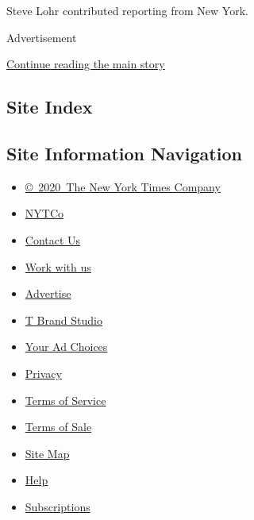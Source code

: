 Steve Lohr contributed reporting from New York.

Advertisement

\protect\hyperlink{after-bottom}{Continue reading the main story}

\hypertarget{site-index}{%
\subsection{Site Index}\label{site-index}}

\hypertarget{site-information-navigation}{%
\subsection{Site Information
Navigation}\label{site-information-navigation}}

\begin{itemize}
\tightlist
\item
  \href{https://help.nytimes.com/hc/en-us/articles/115014792127-Copyright-notice}{©~2020~The
  New York Times Company}
\end{itemize}

\begin{itemize}
\tightlist
\item
  \href{https://www.nytco.com/}{NYTCo}
\item
  \href{https://help.nytimes.com/hc/en-us/articles/115015385887-Contact-Us}{Contact
  Us}
\item
  \href{https://www.nytco.com/careers/}{Work with us}
\item
  \href{https://nytmediakit.com/}{Advertise}
\item
  \href{http://www.tbrandstudio.com/}{T Brand Studio}
\item
  \href{https://www.nytimes.com/privacy/cookie-policy\#how-do-i-manage-trackers}{Your
  Ad Choices}
\item
  \href{https://www.nytimes.com/privacy}{Privacy}
\item
  \href{https://help.nytimes.com/hc/en-us/articles/115014893428-Terms-of-service}{Terms
  of Service}
\item
  \href{https://help.nytimes.com/hc/en-us/articles/115014893968-Terms-of-sale}{Terms
  of Sale}
\item
  \href{https://spiderbites.nytimes.com}{Site Map}
\item
  \href{https://help.nytimes.com/hc/en-us}{Help}
\item
  \href{https://www.nytimes.com/subscription?campaignId=37WXW}{Subscriptions}
\end{itemize}
